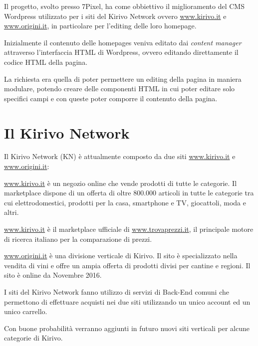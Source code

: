 


Il progetto, svolto presso 7Pixel, ha come obbiettivo il miglioramento del CMS Wordpress utilizzato per i siti del Kirivo Network ovvero \url{www.kirivo.it} e \url{www.origini.it}, in particolare per l’editing delle loro homepage.

Inizialmente il contenuto delle homepages veniva editato dai \emph{content manager} attraverso l’interfaccia HTML di Wordpress, ovvero editando direttamente il codice HTML della pagina.

La richiesta era quella di poter permettere un editing della pagina in maniera modulare, potendo creare delle componenti HTML in cui poter editare solo specifici campi e con queste poter comporre il contenuto della pagina.

\section{Il Kirivo Network}
Il Kirivo Network (KN) è attualmente composto da due siti \url{www.kirivo.it} 
e \url{www.origini.it}:

\url{www.kirivo.it} è un negozio online che vende prodotti di tutte le categorie.
Il marketplace dispone di un offerta di oltre 800.000 articoli in tutte le categorie tra cui
elettrodomestici, prodotti per la casa, smartphone e TV, giocattoli, moda e altri.

\url{www.kirivo.it} è il marketplace ufficiale di \url{www.trovaprezzi.it}, il principale motore
di ricerca italiano per la comparazione di prezzi.

\url{www.origini.it} è una divisione verticale di Kirivo. Il sito è specializzato nella vendita
di vini e offre un ampia offerta di prodotti divisi per cantine e regioni. Il sito
è online da Novembre 2016.

I siti del Kirivo Network fanno utilizzo di servizi di Back-End comuni che permettono 
di effettuare acquisti nei due siti utilizzando un unico account ed un unico carrello.

Con buone probabilità verranno aggiunti in futuro nuovi siti verticali per alcune categorie
di Kirivo.

